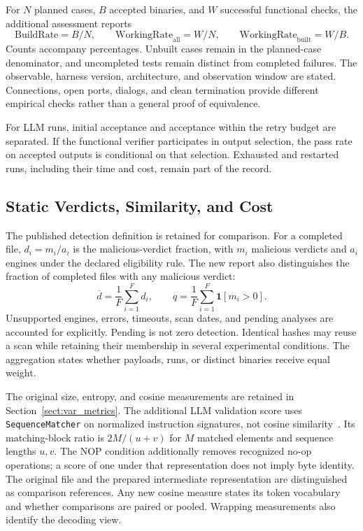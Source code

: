 For $N$ planned cases, $B$ accepted binaries, and $W$ successful
functional checks, the additional assessment reports
\begin{equation}
\mathrm{BuildRate}=B/N,\qquad
\mathrm{WorkingRate}_{\mathrm{all}}=W/N,\qquad
\mathrm{WorkingRate}_{\mathrm{built}}=W/B.
\end{equation}
Counts accompany percentages. Unbuilt cases remain in the planned-case
denominator, and uncompleted tests remain distinct from completed
failures. The observable, harness version, architecture, and observation
window are stated. Connections, open ports, dialogs, and clean
termination provide different empirical checks rather than a general
proof of equivalence.

For LLM runs, initial acceptance and acceptance within the retry budget
are separated. If the functional verifier participates in output
selection, the pass rate on accepted outputs is conditional on that
selection. Exhausted and restarted runs, including their time and
cost, remain part of the record.

\subsection{Static Verdicts, Similarity, and Cost}
The published detection definition is retained for comparison. For a
completed file, $d_i=m_i/a_i$ is the malicious-verdict fraction, with
$m_i$ malicious verdicts and $a_i$ engines under the declared eligibility
rule. The new report also distinguishes the fraction of completed
files with any malicious verdict:
\begin{equation}
\overline d=\frac{1}{F}\sum_{i=1}^{F}d_i,\qquad
q=\frac{1}{F}\sum_{i=1}^{F}\mathbf{1}[m_i>0].
\end{equation}
Unsupported engines, errors, timeouts, scan dates, and pending analyses
are accounted for explicitly. Pending is not zero detection. Identical
hashes may reuse a scan while retaining their membership in several
experimental conditions. The aggregation states whether payloads,
runs, or distinct binaries receive equal weight.

The original size, entropy, and cosine measurements are retained in
Section~\ref{sect:var_metrics}. The additional LLM validation score uses
\texttt{SequenceMatcher} on normalized instruction signatures,
not cosine similarity~\cite{python_difflib}. Its matching-block ratio
is $2M/(u+v)$ for $M$ matched elements and sequence lengths $u,v$.
The NOP condition additionally removes recognized no-op operations;
a score of one under that representation does not imply byte identity.
The original file and the prepared intermediate representation are
distinguished as comparison references. Any new cosine measure states
its token vocabulary and whether comparisons are paired or pooled.
Wrapping measurements also identify the decoding view.

